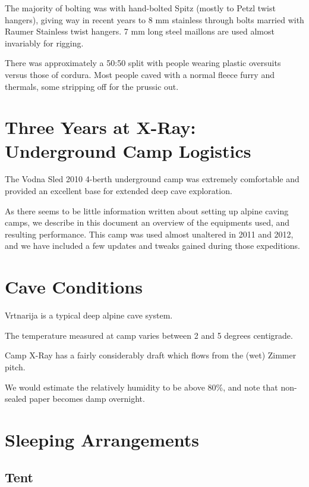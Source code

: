 The majority of bolting was with hand-bolted Spitz (mostly to Petzl
twist hangers), giving way in recent years to 8 mm stainless through
bolts married with Raumer Stainless twist hangers. 7 mm long steel
maillons are used almost invariably for rigging.

There was approximately a 50:50 split with people wearing plastic
oversuits versus those of cordura. Most people caved with a normal
fleece furry and thermals, some stripping off for the prussic out.


\section{Three Years at X-Ray: Underground Camp
Logistics}\label{three-years-at-x-ray-underground-camp-logistics}

The Vodna Sled 2010 4-berth underground camp was extremely comfortable
and provided an excellent base for extended deep cave exploration.

As there seems to be little information written about setting up alpine
caving camps, we describe in this document an overview of the equipments
used, and resulting performance. This camp was used almost unaltered in
2011 and 2012, and we have included a few updates and tweaks gained
during those expeditions.

\section{Cave Conditions}\label{cave-conditions}

Vrtnarija is a typical deep alpine cave system.

The temperature measured at camp varies between 2 and 5 degrees
centigrade.

Camp X-Ray has a fairly considerably draft which flows from the (wet)
Zimmer pitch.

We would estimate the relatively humidity to be above 80\%, and note
that non-sealed paper becomes damp overnight.

\section{Sleeping Arrangements}\label{sleeping-arrangements}

\subsection{Tent}\label{tent}

